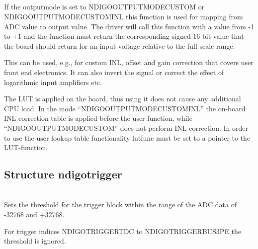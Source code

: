             \\
            \\
            \\
            \par

            \\
            If the \textsf{output\tu mode} is set to \textsf{NDIGO\tu OUTPUT\tu MODE\tu CUSTOM} or\\\textsf{NDIGO\tu OUTPUT\tu MODE\tu CUSTOM\tu INL} this function is used for mapping from ADC value to output value. The driver will call this function with a value from -1 to +1 and the function must return the corresponding signed 16 bit value that the board should return for an input voltage relative to the full scale range.\par

             \par

            This can be used, e.g., for custom INL, offset and gain correction that covers user front end electronics. It can also invert the signal or correct the effect of logarithmic input amplifiers etc.\par

            The LUT is applied on the board, thus using it does not cause any additional CPU load. In the mode ``\textsf{NDIGO\tu OUTPUT\tu MODE\tu CUSTOM\tu INL}'' the on-board INL correction table is applied before the user function, while ``\textsf{NDIGO\tu OUTPUT\tu MODE\tu CUSTOM}'' does not perform INL correction. In order to use the user lookup table functionality \textsf{lut\tu func} must be set to a pointer to the LUT-function.

        \subsection{Structure ndigo\tu trigger}

            \\
            Sets the threshold for the trigger block within the range of the ADC data of -32768 and +32768.\par

            For trigger indices \textsf{NDIGO\tu TRIGGER\tu TDC} to \textsf{NDIGO\tu TRIGGER\tu BUS3\tu PE} the threshold is ignored.\par

